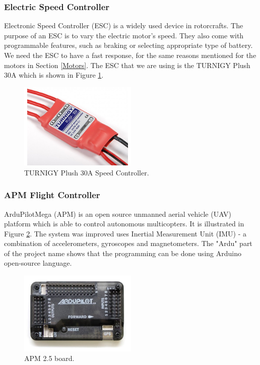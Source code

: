 \subsubsection{Electric Speed Controller}
Electronic Speed Controller (ESC) is a widely used device in rotorcrafts. The purpose of an ESC is to vary the electric motor's speed. They also come with programmable features, such as braking or selecting appropriate type of battery. We need the ESC to have a fast response, for the same reasons mentioned for the motors in Section \ref{Motors}. The ESC that we are using is the TURNIGY Plush 30A which is shown in Figure \ref{esc}.
 
\begin{figure}[H]
  \centering
    \includegraphics[width=0.5\textwidth]{images/esc.jpg}
	\caption{TURNIGY Plush 30A Speed Controller.}
	\label{esc}
\end{figure}

\subsubsection{APM Flight Controller}
ArduPilotMega (APM) is an open source unmanned aerial vehicle (UAV) platform which is able to control autonomous multicopters. It is illustrated in Figure \ref{ardupilot}. The system was improved uses Inertial Measurement Unit (IMU) - a combination of accelerometers, gyroscopes and magnetometers. The "Ardu" part of the project name shows that the programming can be done using Arduino open-source language.

\begin{figure}[H]
  \centering
    \includegraphics[width=0.5\textwidth]{images/ardupilot.jpg}
	\caption{APM 2.5 board.}
	\label{ardupilot}
\end{figure}

